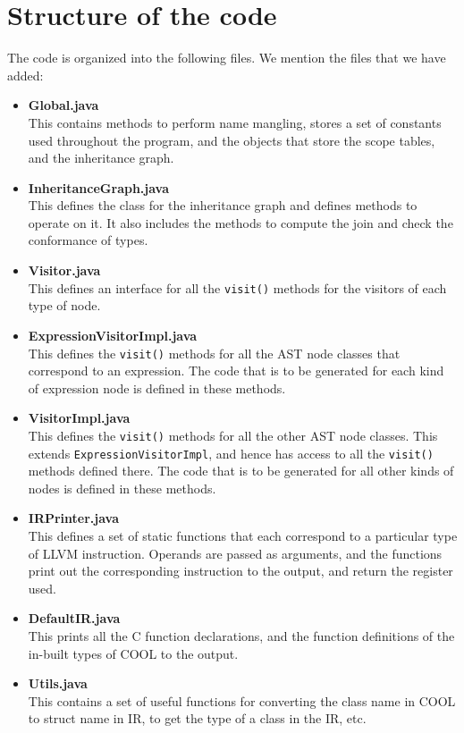 \documentclass{article}
\begin{document}
\section{Structure of the code}
The code is organized into the following files. We mention the files that we have added:
\begin{itemize}
	\item \textbf{Global.java} \\
	This contains methods to perform name mangling, stores a set of constants used throughout the program, and the objects that store the scope tables, and the inheritance graph.
	\item \textbf{InheritanceGraph.java} \\
	This defines the class for the inheritance graph and defines methods to operate on it. It also includes the methods to compute the join and check the conformance of types.
	\item \textbf{Visitor.java} \\
	This defines an interface for all the \verb|visit()| methods for the visitors of each type of node.
	\item \textbf{ExpressionVisitorImpl.java} \\
	This defines the \verb|visit()| methods for all the AST node classes that correspond to an expression. The code that is to be generated for each kind of expression node is defined in these methods.
	\item \textbf{VisitorImpl.java} \\
	This defines the \verb|visit()| methods for all the other AST node classes. This extends \verb|ExpressionVisitorImpl|, and hence has access to all the \verb|visit()| methods defined there. The code that is to be generated for all other kinds of nodes is defined in these methods.
	\item \textbf{IRPrinter.java} \\
	This defines a set of static functions that each correspond to a particular type of LLVM instruction. Operands are passed as arguments, and the functions print out the corresponding instruction to the output, and return the register used.
	\item \textbf{DefaultIR.java} \\
	This prints all the C function declarations, and the function definitions of the in-built types of COOL to the output.
	\item \textbf{Utils.java} \\
	This contains a set of useful functions for converting the class name in COOL to struct name in IR, to get the type of a class in the IR, etc.
\end{itemize}
\end{document}
